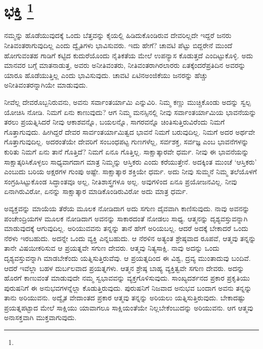 
\chapter[ಭಕ್ತಿ ]{ಭಕ್ತಿ \protect\footnote{}}

ನಮ್ಮನ್ನು ಹೊಡೆಯುವುದಕ್ಕೆ ಒಂದು ಬೆತ್ತವನ್ನು ಕೈಯಲ್ಲಿ ಹಿಡಿದುಕೊಂಡಿರುವ ದೇವ\-ರಿಲ್ಲದೇ ಇದ್ದರೆ ಜನರು ನೀತಿವಂತರಾಗುವುದಿಲ್ಲ ಎಂದು ದ್ವೈತಿಗಳು ಭಾವಿಸುವರು. ಇದು ಹೇಗೆ? ಚಾವಟಿ ಪೆಟ್ಟು ಬಿದ್ದರೇನೆ ಮುಂದೆ ಹೋಗುವಂತಹ ಗಾಡಿಗೆ ಕಟ್ಟಿದ ಕುದುರೆಯೊಂದು ನೈತಿಕತೆಯ ಮೇಲೆ ಉಪನ್ಯಾಸ ಕೊಡುತ್ತದೆ ಎಂದಿಟ್ಟುಕೊಳ್ಳಿ. ಅದು ಮಾನವರ ಬಗ್ಗೆ ಮಾತನಾಡುತ್ತ, ಅವರು ಅನೀತಿವಂತರು, ನೀತಿವಂತರಾಗಿರಲಾರರು ಏತಕ್ಕೆಂದರೆ\break ಪ್ರತಿದಿನ ಅವರನ್ನು ಯಾರೂ ಹೊಡೆಯುತ್ತಿಲ್ಲ ಎಂದು ಭಾವಿಸುವುದು. ಚಾವಟಿ ಏಟಿನ\break ಅಂಜಿಕೆಯು ಜನರನ್ನು ಹೆಚ್ಚು ಅನೀತಿವಂತರನ್ನಾಗಿಯೇ ಮಾಡುವುದು.

ನೀವೆಲ್ಲ ದೇವರೊಬ್ಬನಿರುವನು, ಅವನು ಸರ್ವಾಂತರ್ಯಾಮಿ ಎನ್ನುವಿರಿ. ನಿಮ್ಮ ಕಣ್ಣು ಮುಚ್ಚಿಕೊಂಡು ಅದನ್ನು ಸ್ವಲ್ಪ ಯೋಚಿಸಿ ನೋಡಿ. ನಿಮಗೆ ಏನು ಕಾಣುವುದು? ಆಗ ನಿಮ್ಮ ಮನಸ್ಸಿನಲ್ಲಿ ನೀವು ಸರ್ವಾಂತರ್ಯಾಮಿಯ ಭಾವನೆಯನ್ನು ತರಲು ಪ್ರಯತ್ನಿಸಿದರೆ ನೀವು ಆಕಾಶವನ್ನೊ, ಬಯಲನ್ನೊ, ಸಾಗರವನ್ನೊ ಚಿಂತಿಸುತ್ತಿರುವಿರೆಂದು ನಿಮಗೆ ಗೊತ್ತಾಗುವುದು. ಹೀಗಿದ್ದರೆ ದೇವರ ಸಾರ್ವಂತರ್ಯಾಮಿತ್ವದ ಭಾವನೆ ನಿಮಗೆ ಬರುವುದಿಲ್ಲ. ನಿಮಗೆ ಅದರ ಅರ್ಥವೇ ಗೊತ್ತಾಗುವುದಿಲ್ಲ. ಅದರಂತೆಯೇ ದೇವರಿಗೆ ಸಂಬಂಧಪಟ್ಟ ಗುಣಗಳೆಲ್ಲ, ಸರ್ವಶಕ್ತ, ಸರ್ವಜ್ಞ ಎಂಬ ಭಾವನೆಗಳನ್ನು ಕುರಿತು ನಿಮಗೆ ಏನು ತಾನೆ ಗೊತ್ತಿದೆ? ನಿಮಗೆ ಏನೂ ಗೊತ್ತಿಲ್ಲ. ಸಾಕ್ಷಾತ್ಕಾರವೇ ಧರ್ಮ. ನೀವು ಈ ಭಾವನೆಯನ್ನು ಸಾಕ್ಷಾತ್ಕರಿಸಿಕೊಳ್ಳಲು ಸಾಧ್ಯವಾಗದಾಗ ಮಾತ್ರ ನಿಮ್ಮನ್ನು ಆಸ್ತಿಕರು ಎಂದು ಕರೆಯುತ್ತೇನೆ. ಅದಕ್ಕಿಂತ ಮುಂಚೆ ‘ಆಸ್ತಿಕರು’ ಎಂಬುದು ಬರಿಯ ಅಕ್ಷರಗಳ ಗುಂಪು ಅಷ್ಟೇ. ಸಾಕ್ಷಾತ್ಕಾರ ಶಕ್ತಿಯೇ ಧರ್ಮ. ಅದು ನೀವು ಸುಮ್ಮನೆ ನಿಮ್ಮ ತಲೆಯೊಳಗೆ ಸಂಗ್ರಹಿಸಿಟ್ಟುಕೊಂಡ ಸಿದ್ಧಾಂತವೂ ಅಲ್ಲ, ನೀತಿಶಾಸ್ತ್ರಗಳೂ ಅಲ್ಲ. ಅವುಗಳಿಂದ ಏನೂ ಪ್ರಯೋಜನವಿಲ್ಲ. ನೀವು ಏನಾಗಿರುವಿರೋ, ಏನನ್ನು ಸಾಕ್ಷಾತ್ಕಾರ ಮಾಡಿಕೊಂಡಿರುವಿರೋ ಅದು ಮಾತ್ರ ಧರ್ಮ.

ಅವ್ಯಕ್ತವನ್ನು ಮಾಯೆಯ ತೆರೆಯ ಮೂಲಕ ನೋಡಿದಾಗ ಅದು ಸಗುಣ ದೈವವಾಗಿ ಕಾಣಿಸುವುದು. ನಾವು ಅವನನ್ನು ಪಂಚೇಂದ್ರಿಯಗಳ ಮೂಲಕ ನೋಡಿದಾಗ ಅವನನ್ನು ಸಾಕಾರದಂತೆ ನೋಡಲು ಸಾಧ್ಯ. ಆತ್ಮನನ್ನು ದೃಶ್ಯವಸ್ತುವನ್ನಾಗಿ ಮಾಡುವುದಕ್ಕೆ ಆಗುವುದಿಲ್ಲ. ಅರಿಯುವವನು ತನ್ನನ್ನು ತಾನೆ ಹೇಗೆ ಅರಿಯಬಲ್ಲ. ಆದರೆ ಅದಕ್ಕೆ ಬೇಕಾದರೆ ಒಂದು ನೆರಳು ಇರಬಹುದು. ಅದನ್ನೇ ಒಂದು ವ್ಯಕ್ತಿ ಎನ್ನಬಹುದು. ಆ ನೆರಳಿನ ಅತ್ಯಂತ ಶ್ರೇಷ್ಠವಾದ ರೂಪವೆ, ಆತ್ಮವು ತನ್ನನ್ನು ತಾನೇ ವಿಷಯೀಕರಿಸುವ ಆ ಪ್ರಯತ್ನವೇ ಸಗುಣ ದೇವರು. ಆತ್ಮವು ನಿತ್ಯಸಾಕ್ಷಿ. ನಾವು ಅದನ್ನು ಒಂದು ದೃಶ್ಯವಸ್ತುವನ್ನಾಗಿ ಮಾಡಬೇಕೆಂದು ಯತ್ನಿಸುತ್ತಿರುವೆವು. ಆ ಪ್ರಯತ್ನದಿಂದ ಈ ವಿಶ್ವ, ದ್ರವ್ಯ ಮುಂತಾದುವು ಬಂದಿವೆ. ಆದರೆ ಇವೆಲ್ಲಾ ಬಹಳ ದುರ್ಬಲವಾದ ಪ್ರಯತ್ನಗಳು. ಆತ್ಮನ ಶ್ರೇಷ್ಠ ಬಾಹ್ಯ ವ್ಯಕ್ತಿತ್ವವೇ ಸಗುಣ ದೇವರು. ಅದನ್ನು ಹೊರಗೆ ಕಾಣುವಂತೆ ಮಾಡುವುದೇ ನಮ್ಮ ಸ್ವಭಾವವನ್ನು ವ್ಯಕ್ತಗೊಳಿಸುವುದು. ಸಾಂಖ್ಯದರ್ಶನದ ಪ್ರಕಾರ ಪ್ರಕೃತಿಯು ಪುರುಷನಿಗೆ ಈ ಅನುಭವಗಳನ್ನೆಲ್ಲಾ ಕೊಡುತ್ತಿರುವುದು. ಪುರುಷನಿಗೆ ನಿಜವಾದ ಅನುಭವ ಬಂದಾಗ ಅವನು ತನ್ನನ್ನು ತಾನು ಅರಿಯುವನು. ಅದ್ವೈತ ವೇದಾಂತದ ಪ್ರಕಾರ ಆತ್ಮವು ತನ್ನನ್ನು ಅರಿಯಲು ಯತ್ನಿಸುತ್ತಿರುವುದು. ಬೇಕಾದಷ್ಟು ಪ್ರಯತ್ನಪಟ್ಟಾದ ಮೇಲೆ ಸಾಕ್ಷಿಯು ಯಾವಾಗಲೂ ಸಾಕ್ಷಿಯಂತೆಯೇ ನಿಲ್ಲಬೇಕೆಂಬುದನ್ನು ಅರಿಯುವನು. ಆಗ ಆತ್ಮವು ಅನಾಸಕ್ತವಾಗಿ ಮುಕ್ತವಾಗುವುದು.

